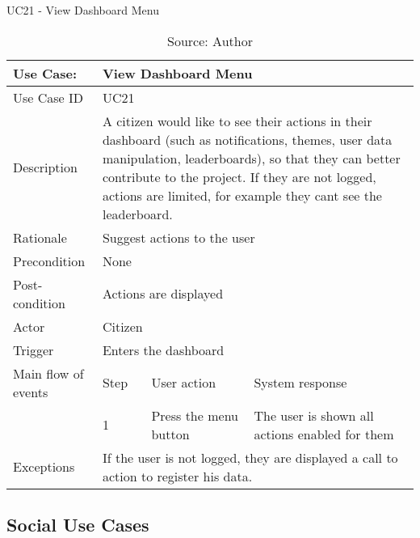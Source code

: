 \begin{table}[h]
\centering
\caption{UC21 - View Dashboard Menu}
\label{uc:21}
\begin{tabular}{|p{3cm}|p{1cm}|p{5cm}|p{5cm}|}
\hline
Use Case:       & \multicolumn{3}{p{11cm}|}{View Dashboard Menu} \\ \hline
Use Case ID     & \multicolumn{3}{p{11cm}|}{UC21} \\ \hline
Description     & \multicolumn{3}{p{11cm}|}{A citizen would like to see their actions in their dashboard (such as notifications, themes, user data manipulation, leaderboards), so that they can better contribute to the project. If they are not logged, actions are limited, for example they cant see the leaderboard.} \\ \hline
Rationale       & \multicolumn{3}{p{11cm}|}{Suggest actions to the user} \\ \hline
Precondition    & \multicolumn{3}{p{11cm}|}{None} \\ \hline
Post-condition  & \multicolumn{3}{p{11cm}|}{Actions are displayed} \\ \hline
Actor           & \multicolumn{3}{p{11cm}|}{Citizen} \\ \hline
Trigger         & \multicolumn{3}{p{11cm}|}{Enters the dashboard} \\ \hline
Main flow of events & Step  & User action & System response \\ \hline
                    & 1     & Press the menu button & The user is shown all actions enabled for them \\ \hline
Exceptions      & \multicolumn{3}{p{11cm}|}{If the user is not logged, they are displayed a call to action to register his data.} \\ \hline
\end{tabular}
\caption*{Source: Author}
\end{table}

\clearpage
\subsection{Social Use Cases}

